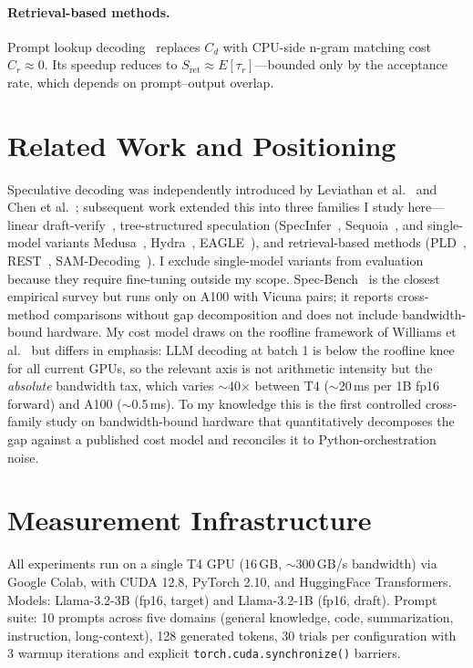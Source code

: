 \documentclass[letterpaper,twocolumn,10pt]{article}
\begin{document}
\paragraph{Retrieval-based methods.}
Prompt lookup decoding~\cite{saxena2023pld} replaces $C_d$ with CPU-side n-gram matching cost $C_r \approx 0$.
Its speedup reduces to $S_{\text{ret}} \approx E[\tau_r]$---bounded only by the acceptance rate, which depends on prompt--output overlap.


\section{Related Work and Positioning}
\label{sec:related}

Speculative decoding was independently introduced by Leviathan et al.~\cite{leviathan2023speculative} and Chen et al.~\cite{chen2023accelerating}; subsequent work extended this into three families I study here---linear draft-verify~\cite{leviathan2023speculative,chen2023accelerating,hf_assisted}, tree-structured speculation (SpecInfer~\cite{miao2024specinfer}, Sequoia~\cite{chen2024sequoia}, and single-model variants Medusa~\cite{cai2024medusa}, Hydra~\cite{ankner2024hydra}, EAGLE~\cite{li2024eagle}), and retrieval-based methods (PLD~\cite{saxena2023pld}, REST~\cite{he2024rest}, SAM-Decoding~\cite{hu2024samdecoding}).
I exclude single-model variants from evaluation because they require fine-tuning outside my scope.
Spec-Bench~\cite{xia2024specbench} is the closest empirical survey but runs only on A100 with Vicuna pairs; it reports cross-method comparisons without gap decomposition and does not include bandwidth-bound hardware.
My cost model draws on the roofline framework of Williams et al.~\cite{williams2009roofline} but differs in emphasis: LLM decoding at batch 1 is below the roofline knee for all current GPUs, so the relevant axis is not arithmetic intensity but the \emph{absolute} bandwidth tax, which varies $\sim$40$\times$ between T4 ($\sim$20\,ms per 1B fp16 forward) and A100 ($\sim$0.5\,ms).
To my knowledge this is the first controlled cross-family study on bandwidth-bound hardware that quantitatively decomposes the gap against a published cost model and reconciles it to Python-orchestration noise.


\section{Measurement Infrastructure}
\label{sec:infra}

All experiments run on a single T4 GPU (16\,GB, $\sim$300\,GB/s bandwidth) via Google Colab, with CUDA 12.8, PyTorch 2.10, and HuggingFace Transformers.
Models: Llama-3.2-3B (fp16, target) and Llama-3.2-1B (fp16, draft).
Prompt suite: 10 prompts across five domains (general knowledge, code, summarization, instruction, long-context), 128 generated tokens, 30 trials per configuration with 3 warmup iterations and explicit \texttt{torch.cuda.synchronize()} barriers.
\end{document}
